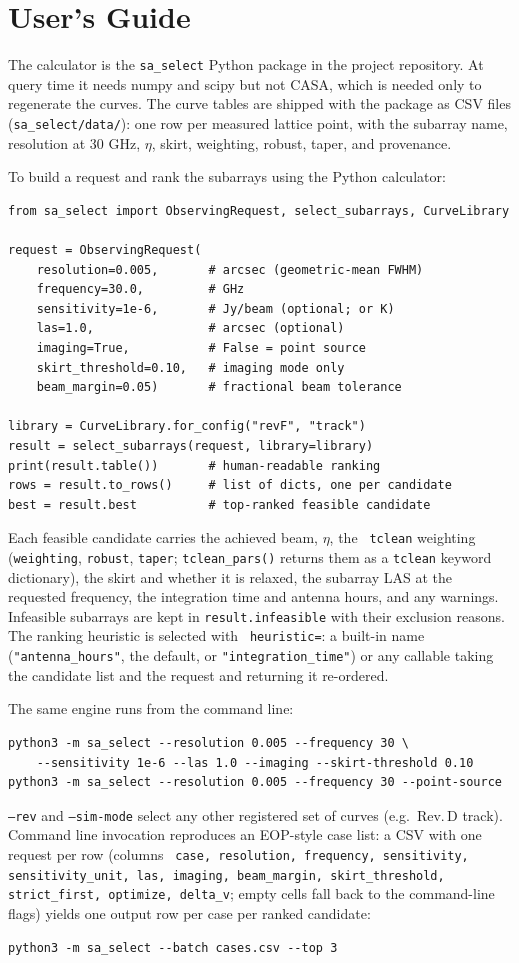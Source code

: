 \documentclass[11pt]{article}
\begin{document}
\section{User's Guide}
\label{sec:guide}

The calculator is the {\tt sa\_select} Python package in the project
repository.  At query time it needs numpy and scipy but not CASA, which is needed
only to regenerate the curves.  The curve tables are shipped with the package as CSV files
({\tt sa\_select/data/}): one row per measured lattice point, with
the subarray name, resolution at 30 GHz, $\eta$, skirt, weighting,
robust, taper, and provenance.

To build a request and rank the subarrays using the Python calculator:
\begin{verbatim}
from sa_select import ObservingRequest, select_subarrays, CurveLibrary

request = ObservingRequest(
    resolution=0.005,       # arcsec (geometric-mean FWHM)
    frequency=30.0,         # GHz
    sensitivity=1e-6,       # Jy/beam (optional; or K)
    las=1.0,                # arcsec (optional)
    imaging=True,           # False = point source
    skirt_threshold=0.10,   # imaging mode only
    beam_margin=0.05)       # fractional beam tolerance

library = CurveLibrary.for_config("revF", "track")
result = select_subarrays(request, library=library)
print(result.table())       # human-readable ranking
rows = result.to_rows()     # list of dicts, one per candidate
best = result.best          # top-ranked feasible candidate
\end{verbatim}
Each feasible candidate carries the achieved beam, $\eta$, the {\tt
tclean} weighting ({\tt weighting}, {\tt robust}, {\tt taper};
{\tt tclean\_pars()} returns them as a {\tt tclean} keyword
dictionary), the
skirt and whether it is relaxed, the subarray LAS at the requested
frequency, the integration time and antenna hours, and any warnings.
Infeasible subarrays are kept in {\tt result.infeasible} with their
exclusion reasons.  The ranking heuristic is selected with {\tt
heuristic=}: a built-in name ({\tt "antenna\_hours"}, the default, or
{\tt "integration\_time"}) or any callable taking the candidate list
and the request and returning it re-ordered.

The same engine runs from the command line:
\begin{verbatim}
python3 -m sa_select --resolution 0.005 --frequency 30 \
    --sensitivity 1e-6 --las 1.0 --imaging --skirt-threshold 0.10
python3 -m sa_select --resolution 0.005 --frequency 30 --point-source
\end{verbatim}
{\tt --rev} and {\tt --sim-mode} select any other registered set of
curves (e.g.\ Rev.\,D track).  Command line invocation reproduces an
EOP-style case list: a CSV with one request per row (columns {\tt
  case, resolution, frequency, sensitivity, sensitivity\_unit, las,
  imaging, beam\_margin, skirt\_threshold, strict\_first, optimize,
  delta\_v}; empty cells fall back to the command-line flags) yields
one output row per case per ranked candidate:
\begin{verbatim}
python3 -m sa_select --batch cases.csv --top 3
\end{verbatim}
\end{document}
